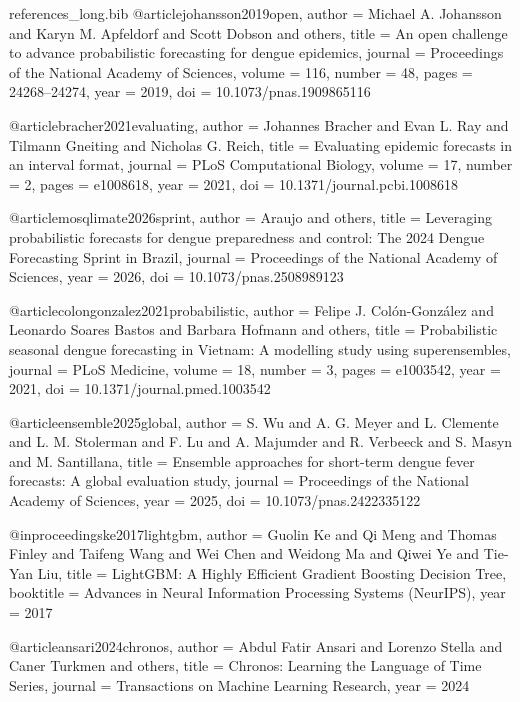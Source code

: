 \begin{filecontents*}[overwrite]{references_long.bib}
@article{johansson2019open,
  author  = {Michael A. Johansson and Karyn M. Apfeldorf and Scott Dobson and others},
  title   = {An open challenge to advance probabilistic forecasting for dengue epidemics},
  journal = {Proceedings of the National Academy of Sciences},
  volume  = {116},
  number  = {48},
  pages   = {24268--24274},
  year    = {2019},
  doi     = {10.1073/pnas.1909865116}
}

@article{bracher2021evaluating,
  author  = {Johannes Bracher and Evan L. Ray and Tilmann Gneiting and Nicholas G. Reich},
  title   = {Evaluating epidemic forecasts in an interval format},
  journal = {PLoS Computational Biology},
  volume  = {17},
  number  = {2},
  pages   = {e1008618},
  year    = {2021},
  doi     = {10.1371/journal.pcbi.1008618}
}

@article{mosqlimate2026sprint,
  author  = {Araujo and others},
  title   = {Leveraging probabilistic forecasts for dengue preparedness and control: The 2024 Dengue Forecasting Sprint in {Brazil}},
  journal = {Proceedings of the National Academy of Sciences},
  year    = {2026},
  doi     = {10.1073/pnas.2508989123}
}

@article{colongonzalez2021probabilistic,
  author  = {Felipe J. Col{\'o}n-Gonz{\'a}lez and Leonardo Soares Bastos and Barbara Hofmann and others},
  title   = {Probabilistic seasonal dengue forecasting in {Vietnam}: A modelling study using superensembles},
  journal = {PLoS Medicine},
  volume  = {18},
  number  = {3},
  pages   = {e1003542},
  year    = {2021},
  doi     = {10.1371/journal.pmed.1003542}
}

@article{ensemble2025global,
  author  = {S. Wu and A. G. Meyer and L. Clemente and L. M. Stolerman and F. Lu and A. Majumder and R. Verbeeck and S. Masyn and M. Santillana},
  title   = {Ensemble approaches for short-term dengue fever forecasts: A global evaluation study},
  journal = {Proceedings of the National Academy of Sciences},
  year    = {2025},
  doi     = {10.1073/pnas.2422335122}
}

@inproceedings{ke2017lightgbm,
  author    = {Guolin Ke and Qi Meng and Thomas Finley and Taifeng Wang and Wei Chen and Weidong Ma and Qiwei Ye and Tie-Yan Liu},
  title     = {{LightGBM}: A Highly Efficient Gradient Boosting Decision Tree},
  booktitle = {Advances in Neural Information Processing Systems (NeurIPS)},
  year      = {2017}
}

@article{ansari2024chronos,
  author  = {Abdul Fatir Ansari and Lorenzo Stella and Caner Turkmen and others},
  title   = {Chronos: Learning the Language of Time Series},
  journal = {Transactions on Machine Learning Research},
  year    = {2024}
}


\end{filecontents*}
